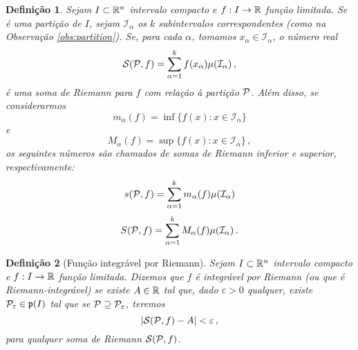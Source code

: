 \documentclass[a4paper,12pt]{extreport}
\newtheorem{mydef}{Definição}
\newif\ifspacesbetweentheos
\newcommand{\theonewpage}{
\ifspacesbetweentheos
  \newpage
\fi
}
\begin{document}
\theonewpage


\begin{mydef}
  Sejam $I \subset \mathbb{R}^n$ intervalo compacto e
  $f:I \to \mathbb{R}$ função limitada.
  Se \partition é uma partição de $I$,
  sejam $\mathcal{I_\alpha}$
  os $k$ subintervalos correspondentes
  (como na Observação \ref{obs:partition}).
  Se, para cada $\alpha$,
  tomamos $x_\alpha \in \mathcal{I}_\alpha$,
  o número real
  \begin{equation}
    \mathcal{S}(\mathcal{P}, f)
    = \sum_{\alpha=1}^{k} f(x_\alpha) \mu(\mathcal{I}_\alpha)\,,
  \end{equation}
  é uma \emph{soma de Riemann}
  para $f$ com relação à partição $\mathcal{P}$.
  Além disso, se considerarmos
  \begin{equation}
    m_\alpha(f) = \inf \{f(x): x \in \mathcal{I}_\alpha \}
  \end{equation}
  e
  \begin{equation}
    M_\alpha(f) = \sup \{f(x): x \in \mathcal{I}_\alpha \}\,,
  \end{equation}
  os seguintes números são chamados de
  \emph{somas de Riemann inferior e superior}, respectivamente:
  \begin{equation}
    s(\mathcal{P}, f) = \sum_{\alpha=1}^{k} m_\alpha(f) \mu(\mathcal{I}_\alpha)
  \end{equation}
  \begin{equation}
    S(\mathcal{P}, f) = \sum_{\alpha=1}^{k} M_\alpha(f) \mu(\mathcal{I}_\alpha)\,.
  \end{equation}
\end{mydef}


\theonewpage

\begin{mydef}[Função integrável por Riemann]\label{def:riemann_integravel}
  Sejam $I \subset \mathbb{R}^n$ intervalo compacto e\linebreak
  $f:I \to \mathbb{R}$ função limitada.
  Dizemos que $f$ é \emph{integrável por Riemann}
  (ou que é \emph{Riemann-integrável})
  se existe $A \in \mathbb{R}$ tal que,
  dado $\varepsilon > 0$ qualquer,
  existe $\mathcal{P}_\varepsilon \in \mathfrak{p}(I)$
  tal que se $\mathcal{P} \supseteq \mathcal{P}_\varepsilon$,
  teremos
  \begin{equation}
    |\mathcal{S}(\mathcal{P}, f) - A| < \varepsilon\,,
  \end{equation}
  para qualquer soma de Riemann $\mathcal{S}(\mathcal{P}, f)$.
\end{mydef}
\end{document}
